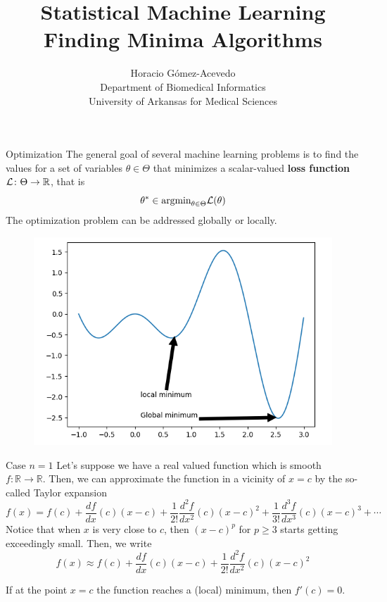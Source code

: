 \documentclass{beamer}
\title{Statistical Machine Learning\\ Finding Minima Algorithms}
\author{Horacio G\'omez-Acevedo\\ Department of Biomedical Informatics\\
	University of Arkansas for Medical Sciences}
\begin{document}
	

	\begin{frame}[plain]
		\maketitle
	\end{frame}
	\begin{frame}{Optimization}
		The general goal of several machine learning problems is to find the values for a set of variables $\theta \in \Theta$ that minimizes a scalar-valued \textbf{loss function} ${\cal L} \colon \Theta \to \mathbb{R}$, that is
		\begin{equation*}
			\theta^* \in \text{argmin}_{\theta \in \Theta} \cal{L}(\theta)
		\end{equation*}
		The optimization problem can be addressed globally or locally. 
\begin{figure}[h]
	\centering
		\includegraphics[scale=0.4]{../../Figures/fig_murphy_81a.png}
\end{figure}		
		
	\end{frame}
	\begin{frame}{Case $n=1$}
		Let's suppose we have a real valued function which is smooth $f\colon \mathbb{R}\to \mathbb{R}$. Then, we can approximate the function in a vicinity of $x=c$ by the so-called Taylor expansion
		\begin{equation*}
			f(x)= f(c)+ \frac{df}{dx}(c) (x-c)+  \frac{1}{2!} \frac{d^2f}{dx^2}(c) (x-c)^2 +  \frac{1}{3!} \frac{d^3f}{dx^3}(c) (x-c)^3+ \cdots
		\end{equation*}
		Notice that when $x$ is very close to $c$, then $(x-c)^p$ for $p\ge 3$ starts getting exceedingly small. Then, we write 
			\begin{equation*}
			f(x) \approx f(c)+ \frac{df}{dx}(c) (x-c)+  \frac{1}{2!} \frac{d^2f}{dx^2}(c) (x-c)^2 
		\end{equation*}
		
		If at the point $x=c$ the function reaches a (local) minimum, then $f'(c)=0$.
		
		
	\end{frame}
\end{document}
